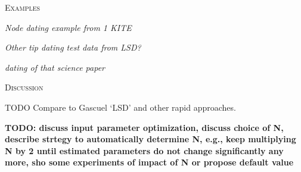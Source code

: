 \documentclass{llncs}
\renewcommand{\section}[1]{%
\bigskip
\begin{center}
\begin{Large}
\normalfont\scshape #1
\medskip
\end{Large}
\end{center}}
\renewcommand{\subsection}[1]{%
\bigskip
\begin{center}
\begin{large}
\normalfont\itshape #1
\end{large}
\end{center}}
\begin{document}
\section{Examples}
\subsection{Node dating example from 1 KITE}

\subsection{Other tip dating test data from LSD?}

\subsection{dating of that science paper}

\section{Discussion}

TODO Compare to Gascuel `LSD' and other rapid approaches.

{\bf TODO: discuss input parameter optimization, discuss choice of N, describe strtegy to automatically determine N, e.g., keep multiplying N by 2 until 
estimated parameters do not change significantly any more, sho some experiments of impact of N or propose default value}




\end{document}
